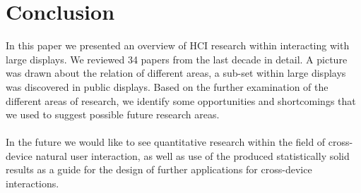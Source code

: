 \section{Conclusion}\label{Sec:Conclusion}
In this paper we presented an overview of HCI research within interacting with large displays. We reviewed 34 papers from the last decade in detail. A picture was drawn about the relation of different areas, a sub-set within large displays was discovered in public displays. Based on the further examination of the different areas of research, we identify some opportunities and shortcomings that we used to suggest possible future research areas.\\
\\

In the future we would like to see quantitative research within the field of cross-device natural user interaction, as well as use of the produced statistically solid results as a guide for the design of further applications for cross-device interactions.\\

